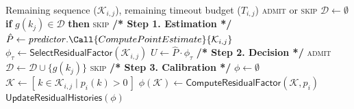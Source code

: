 \begin{algorithm}[t]
\caption{Remaining-Sequence Admission}
\label{alg:admission}
\footnotesize
\renewcommand{\algorithmicrequire}{\textbf{Input:}}
\renewcommand{\algorithmicensure}{\textbf{Output:}}
\begin{algorithmic}[1]
\Require Remaining sequence ($\mathcal K_{i,j}$), remaining timeout budget ($T_{i,j}$)
\Ensure \textsc{admit} or \textsc{skip}
\State $\mathcal D\gets\emptyset$ \label{alg:ad:init} 
\State
{}
  \State \textbf{if} $g(k_j)\in\mathcal D$ \textbf{then} \Return \textsc{skip} \label{alg:ad:skip} 
  \State
  \State \textbf{/* Step 1. Estimation */}
  \State $\hat P\gets\mathit{predictor}.\Call{ComputePointEstimate}{\mathcal K_{i,j}}$ \label{alg:ad:estimate}
  \State $\phi_\tau\gets\textsf{SelectResidualFactor}(\mathcal K_{i,j})$ \label{alg:ad:select} 
  \State $U\gets\hat P\cdot\phi_\tau$ \label{alg:ad:upper}
  \State
  \State \textbf{/* Step 2. Decision */}
   \label{alg:ad:decide}
    \State \Return \textsc{admit}
  \Else
    \State $\mathcal D\gets\mathcal D\cup\{g(k_j)\}$ \label{alg:ad:disable}
    \State \Return \textsc{skip} \label{alg:ad:reject}
  \EndIf
\EndProcedure
\State
{}
  \State \textbf{/* Step 3. Calibration */}
  \State $\phi\gets\emptyset$
    \State $\mathcal K\gets[\,k\in\mathcal K_{i,j}\mid p_i(k)>0\,]$ \label{alg:ad:measured}
    \State $\phi(\mathcal K)\gets\textsf{ComputeResidualFactor}(\mathcal K,p_i)$ \label{alg:ad:residual}
  \EndFor
  \State $\textsf{UpdateResidualHistories}(\phi)$ \label{alg:ad:histories} 
\EndProcedure
\end{algorithmic}
\end{algorithm}
